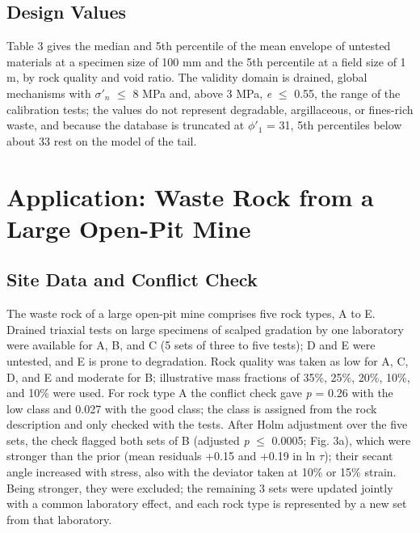 \documentclass[Journal,letterpaper]{ascelike-new}
\begin{document}
\subsection{Design Values}
Table 3 gives the median and 5th percentile of the mean envelope of untested materials at a specimen size of 100 mm and the 5th percentile at a field size of 1 m, by rock quality and void ratio. The validity domain is drained, global mechanisms with $\sigma'_n$ $\le$ 8 MPa and, above 3 MPa, \textit{e} $\le$ 0.55, the range of the calibration tests; the values do not represent degradable, argillaceous, or fines-rich waste, and because the database is truncated at $\phi'_1$ = 31\textdegree{}, 5th percentiles below about 33\textdegree{} rest on the model of the tail.

\section{Application: Waste Rock from a Large Open-Pit Mine}
\subsection{Site Data and Conflict Check}
The waste rock of a large open-pit mine comprises five rock types, A to E. Drained triaxial tests on large specimens of scalped gradation by one laboratory were available for A, B, and C (5 sets of three to five tests); D and E were untested, and E is prone to degradation. Rock quality was taken as low for A, C, D, and E and moderate for B; illustrative mass fractions of 35\%, 25\%, 20\%, 10\%, and 10\% were used. For rock type A the conflict check gave \textit{p} = 0.26 with the low class and 0.027 with the good class; the class is assigned from the rock description and only checked with the tests. After Holm adjustment over the five sets, the check flagged both sets of B (adjusted \textit{p} $\le$ 0.0005; Fig. 3a), which were stronger than the prior (mean residuals +0.15 and +0.19 in ln $\tau$); their secant angle increased with stress, also with the deviator taken at 10\% or 15\% strain. Being stronger, they were excluded; the remaining 3 sets were updated jointly with a common laboratory effect, and each rock type is represented by a new set from that laboratory.
\end{document}
